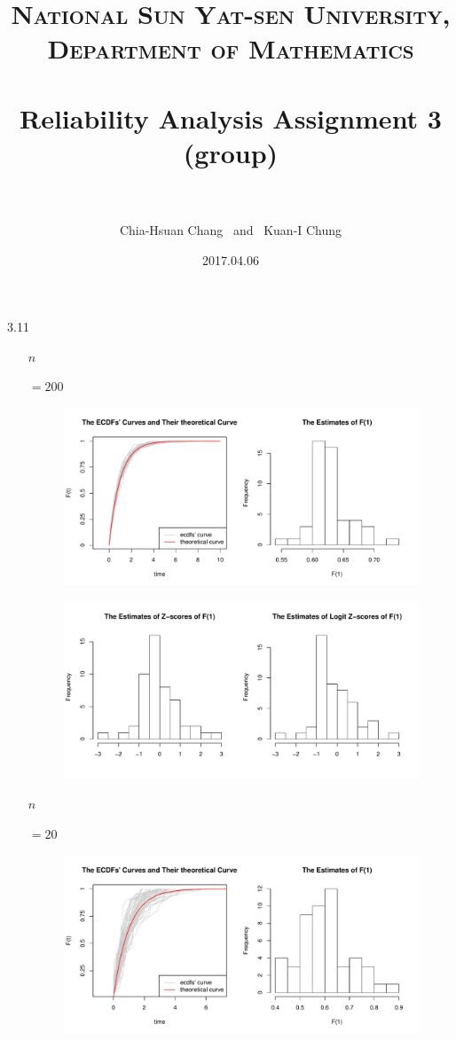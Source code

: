 \documentclass[paper=a4, fontsize=11pt]{scrartcl} %
\title{	
\normalfont \normalsize 
\textsc{National Sun Yat-sen University, Department of Mathematics} \\ [25pt] %
\horrule{0.5pt} \\[0.4cm] %
\huge Reliability Analysis Assignment 3 \\(group)\\ %
\horrule{2pt} \\[0.5cm] %
}
\author{Chia-Hsuan Chang \ and \ Kuan-I Chung} %
\date{\normalsize 2017.04.06} %
\numberwithin{equation}{section} %
\numberwithin{figure}{section} %
\numberwithin{table}{section} %
\begin{document}
\maketitle %


\newpage
3.11

\begin{itemize}
	\item[$n$]{ $=200$
		\begin{figure}[h]
			\includegraphics[width = 6 in]{3_10_ab.pdf}
		\end{figure}
		\begin{figure}[h]
			\includegraphics[width = 6 in]{3_10_cd.pdf}
		\end{figure}		
	}
	\newpage
	\item[$n$]{ $=20$
		\begin{figure}[h]
			\includegraphics[width = 6 in]{3_11_1.pdf}

\end{figure}}
\end{itemize}
\end{document}
